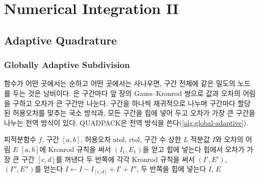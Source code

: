 \chapter{Numerical Integration II}
\label{ch:quadrature-2}


\section{Adaptive Quadrature}
\label{sec:adaptive}

\subsection{Globally Adaptive Subdivision}

함수가 어떤 곳에서는 순하고 어떤 곳에서는 사나우면, 구간 전체에 같은 밀도의 노드를 두는 것은 낭비이다. 은 구간마다 앞 장의 Gauss--Kronrod 쌍으로 값과 오차의 어림을 구하고 오차가 큰 구간만 나눈다. 구간을 하나씩 재귀적으로 나누며 구간마다 할당된 허용오차를 맞추는 국소 방식과, 모든 구간을 힙에 넣어 두고 오차가 가장 큰 구간을 나누는 전역 방식이 있다. QUADPACK은 전역 방식을 쓴다(\cref{alg:global-adaptive}).

\begin{algorithm}[t]
\begin{algorithmic}[1]
\Require 피적분함수 $f$, 구간 $[a,b]$, 허용오차 $\mathrm{atol}$, $\mathrm{rtol}$, 구간 수 상한 $L$
\Ensure 적분값 $I$와 오차의 어림 $E$
\State $[a,b]$에 Kronrod 규칙을 써서 $(I_1,E_1)$을 얻고 힙에 넣는다
  \State 힙에서 오차가 가장 큰 구간 $[c,d]$를 꺼낸다
  \State 두 반쪽에 각각 Kronrod 규칙을 써서 $(I',E')$, $(I'',E'')$를 얻는다 
  \State $I\gets I-I_{[c,d]}+I'+I''$, 두 반쪽을 힙에 넣는다
\EndWhile
\State \Return $I$, $E$
\end{algorithmic}
\caption{전역 적응 구적}
\label{alg:global-adaptive}
\end{algorithm}

